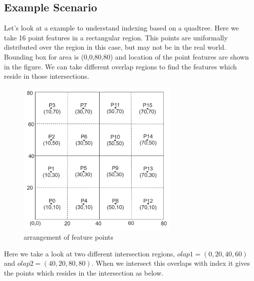 \subsection{Example Scenario}
Let's look at a example to understand indexing based on a quadtree. Here we take 16 point features in a rectangular region. This points are uniformally distributed over the region in this case, but may not be in the real world. Bounding box for area is (0,0,80,80) and location of the point features are shown in the figure. We can take different overlap regions to find the features which reside in those intersections.
\newline
\begin{figure}[h]
    \centering
    \includegraphics[width=0.7\textwidth]{pix/p10}
    \caption{arrangement of feature points}
    \label{fig:m1}
\end{figure}
\newline
\par Here we take a look at two different intersection regions, $olap1 = (0,20,40,60)$ and $olap2 = (40,20,80,80)$. When we intersect this overlaps with index it gives the points which resides in the intersection as below.

